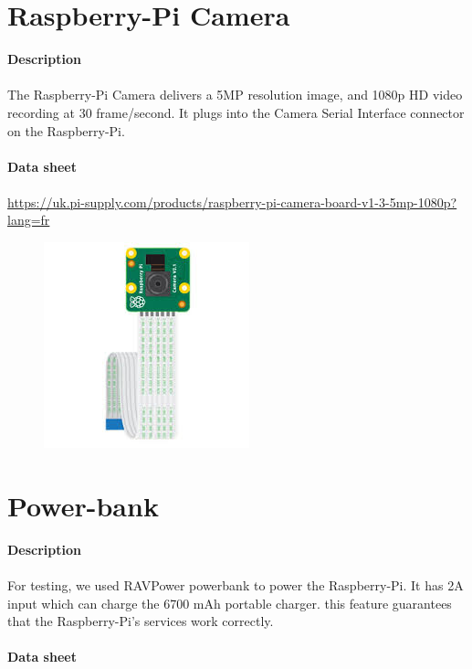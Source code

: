 \documentclass[12pt]{report}
\begin{document}
\section{Raspberry-Pi Camera}
\textbf{Description}
\paragraph{}
The Raspberry-Pi Camera delivers a 5MP resolution image, and 1080p HD video recording at 30 frame/second. It plugs into the Camera Serial Interface connector on the Raspberry-Pi. \\ \\
\textbf{Data sheet} 
\paragraph{}
\url{https://uk.pi-supply.com/products/raspberry-pi-camera-board-v1-3-5mp-1080p?lang=fr}
\begin{figure}[H]
	\begin{center}
		\includegraphics[scale=0.6]{res/camera.jpg}
	\end{center}
\end{figure}
\section{Power-bank}
\textbf{Description}
\paragraph{}
For testing, we used RAVPower powerbank to power the Raspberry-Pi. It has 2A input which can charge the 6700 mAh portable charger. this feature guarantees that the Raspberry-Pi's services work correctly. \\ \\
\textbf{Data sheet} 
\end{document}
